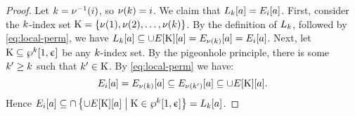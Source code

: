 \begin{proof}
Let $k = \nu^{-1}(i)$, so $\nu(k) = i$.
We claim that $L_{k}[a] = E_{i}[a]$.
First, consider the $k$-index set 
$\mathrm{K} = \left\{\nu(1), \nu(2), \dots, \nu(k)\right\}$.
By the definition of $L_{k}$, followed by \cref{eq:local-perm},
we have $L_{k}[a] \subseteq \cup E[\mathrm{K}][a] = 
E_{\nu(k)}[a] = E_{i}[a]$.
Next, let $\mathrm{K} \subseteq \wp^{k}{[}1,\upepsilon]$ be any $k$-index set. By the
pigeonhole principle, there is some ${k'} \geq k$ such that ${k'} \in \mathrm{K}$.
By \cref{eq:local-perm} we have:
\[
  E_{i}[a] = E_{\nu(k)}[a] \subseteq 
  E_{\nu({k'})}[a] \subseteq \cup E[\mathrm{K}][a].
\]
Hence
$E_{i}[a] \subseteq \cap
\left\{\cup E[\mathrm{K}][a]\mathrel{}\middle|\mathrel{}\mathrm{K} \in \wp^{k}{[}1, \upepsilon]\right\} =
L_{k}[a]$.
\end{proof}